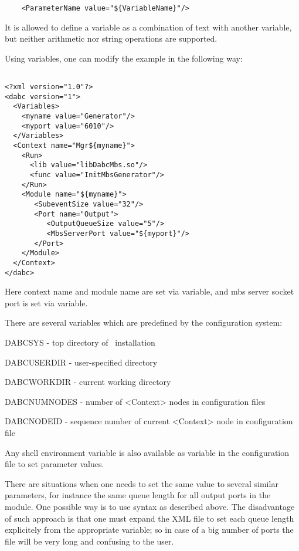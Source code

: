 \begin{small}
\begin{verbatim}
    <ParameterName value="${VariableName}"/>
\end{verbatim}
\end{small}

It is allowed to define a variable as a combination of text with another variable, 
but neither arithmetic nor string operations are supported. 

Using variables, one can modify the example in the following way:

\begin{small}
\begin{verbatim}

<?xml version="1.0"?>
<dabc version="1">
  <Variables>
    <myname value="Generator"/> 
    <myport value="6010"/> 
  </Variables>
  <Context name="Mgr${myname}">
    <Run>
      <lib value="libDabcMbs.so"/>
      <func value="InitMbsGenerator"/>
    </Run>
    <Module name="${myname}">
       <SubeventSize value="32"/>
       <Port name="Output">
          <OutputQueueSize value="5"/>
          <MbsServerPort value="${myport}"/>
       </Port>
    </Module>
  </Context>
</dabc>
\end{verbatim}
\end{small}

Here context name and module name are set via  variable,
and mbs server socket port is set via  variable.

There are several variables which are predefined by the configuration system:

\bbul
\item DABCSYS - top directory of \dabc\ installation
\item DABCUSERDIR - user-specified directory
\item DABCWORKDIR - current working directory
\item DABCNUMNODES - number of <Context> nodes in configuration files
\item DABCNODEID - sequence number of current <Context> node in configuration file 
\ebul

Any shell environment variable 
is also available as variable in the configuration file to set parameter values. 

There are situations when one needs to set the same value to several similar parameters,
for instance the same queue length for all output ports in the module. 
One possible way is to use syntax as described above. 
The disadvantage of such approach is that one must expand the XML file
to set each queue length explicitely from the appropriate variable;
so in case of a big number of ports the file will be very long and 
confusing to the user.

